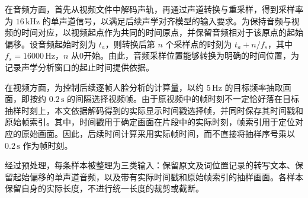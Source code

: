 在音频方面，首先从视频文件中解码声轨，再通过声道转换与重采样，得到采样率为 $16\,\mathrm{kHz}$ 的单声道信号，以满足后续声学对齐模型的输入要求。为保持音频与视频的时间对应，以视频起点作为共同的时间原点，并保留音频相对于该原点的起始偏移。设音频起始时刻为 $t_a$，则转换后第 $n$ 个采样点的时刻为
$t_a+n/f_s$，其中 $f_s=16000\,\mathrm{Hz}$，$n$ 从0开始。由此，音频采样位置能够转换为明确的时间位置，为记录声学分析窗口的起止时间提供依据。

在视频方面，为控制后续逐帧人脸分析的计算量，以约 $5\,\mathrm{Hz}$ 的目标频率抽取画面，即按约 $0.2\,\mathrm{s}$ 的间隔选择视频帧。由于原视频中的帧时刻不一定恰好落在目标抽样时刻上，本文依据解码得到的实际显示时间戳选择帧，并同时保存其时间戳和原始帧索引。其中，时间戳用于确定画面在片段中的实际时刻，帧索引用于定位对应的原始画面。因此，后续时间计算采用实际帧时间，而不直接将抽样序号乘以 $0.2\,\mathrm{s}$ 作为帧时刻。

经过预处理，每条样本被整理为三类输入：保留原文及词位置记录的转写文本、保留起始偏移的单声道音频，以及带有实际时间戳和原始帧索引的抽样画面。各样本保留自身的实际长度，不进行统一长度的裁剪或截断。










